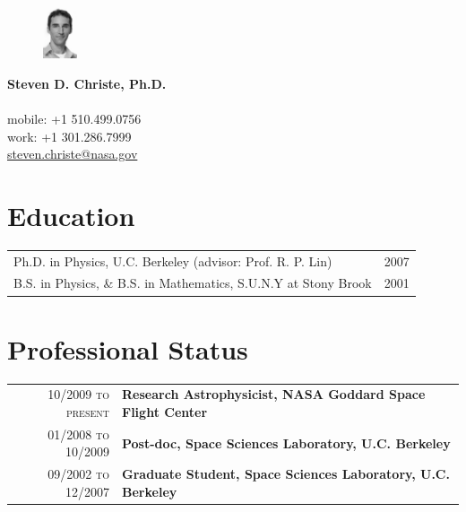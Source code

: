 \documentclass[11pt]{article}
\makeatletter
\newcommand{\name}[1]{\LARGE\textbf{#1}}
\newcommand{\address}[1]{\small{\color{lgray}{#1}}}
\newcommand{\tel}[1]{\small{#1}}
\newcommand{\email}[1]{\href{mailto:#1}{\small{#1}}}
\newcommand{\web}[2]{\href{#1}{\small{#2}}}
\newenvironment{ftabular}[1]
{\begin{tabular*}{0.95\textwidth}{@{\extracolsep{\fill}}#1}}
{\end{tabular*}}
\makeatother
\begin{document}
\vspace{-2.5in}
\begin{figure}
\includegraphics[width=0.09\textwidth]{mugshot.jpg}
\end{figure}


\name{Steven D. Christe, Ph.D.} \\
\address{Solar Physics Laboratory, Heliophysics Division \\
NASA Goddard Space Flight Center, Greenbelt, MD} \\
\tel{mobile: +1 510.499.0756}\\
\tel{work: +1 301.286.7999} \\
\email{steven.christe@nasa.gov}

\section{Education}
\begin{ftabular}{lr}
Ph.D. in Physics, U.C. Berkeley (advisor: Prof. R. P. Lin) & \textsc{2007}\\
B.S. in Physics, \& B.S. in Mathematics, S.U.N.Y at Stony Brook & \textsc{2001}\\
\end{ftabular}

\section{Professional Status}
\begin{ftabular}{r|p{14cm}}
\textsc{10/2009 to present} & \textbf{Research Astrophysicist, NASA Goddard Space Flight Center} \\


\textsc{01/2008 to 10/2009} & \textbf{Post-doc, Space Sciences Laboratory, U.C. Berkeley}\\


\textsc{09/2002 to 12/2007} & \textbf{Graduate Student, Space Sciences Laboratory, U.C. Berkeley}\end{ftabular}
\end{document}
